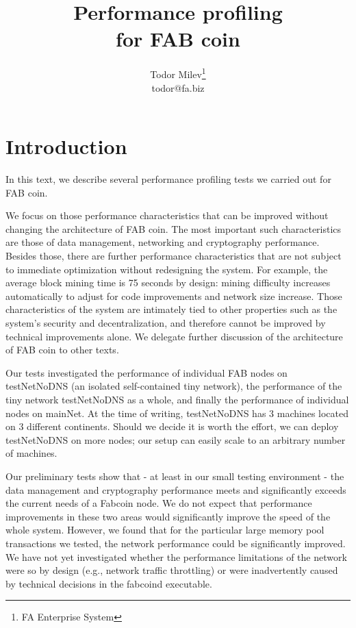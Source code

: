 \documentclass{article}
\title{
Performance profiling \\
for FAB coin
}
\author{Todor Milev\footnote{FA Enterprise System}\\ todor@fa.biz}
\begin{document}
\maketitle
\section{Introduction}
In this text, we describe several performance profiling tests we carried out for FAB coin. 

We focus on those performance characteristics that can be improved without changing the architecture of FAB coin.
The most important such characteristics are those of data management, networking and cryptography performance. Besides those, there are further performance characteristics that are not subject to immediate optimization without redesigning the system. For example, the average block mining time is 75 seconds by design: mining difficulty increases automatically to adjust for code improvements and network size increase. Those characteristics of the system are intimately tied to other properties such as the system's security and decentralization, and therefore cannot be improved by technical improvements alone. We delegate further discussion of the architecture of FAB coin to other texts.


Our tests investigated the performance of individual FAB nodes on testNetNoDNS (an isolated self-contained tiny network), the performance of the tiny network testNetNoDNS as a whole, and finally the performance of individual nodes on mainNet. At the time of writing, testNetNoDNS has $3$ machines located on $3$ different continents. Should we decide it is worth the effort, we can deploy testNetNoDNS on more nodes; our setup can easily scale to an arbitrary number of machines.

Our preliminary tests show that - at least in our small testing environment - the data management and cryptography performance meets and significantly exceeds the current needs of a Fabcoin node. We do not expect that performance improvements in these two areas would significantly improve the speed of the whole system. However, we found that for the particular large memory pool transactions we tested, the network performance could be significantly improved. We have not yet investigated whether the performance limitations of the network were so by design (e.g., network traffic throttling) or were inadvertently caused by technical decisions in the fabcoind executable.
\end{document}
